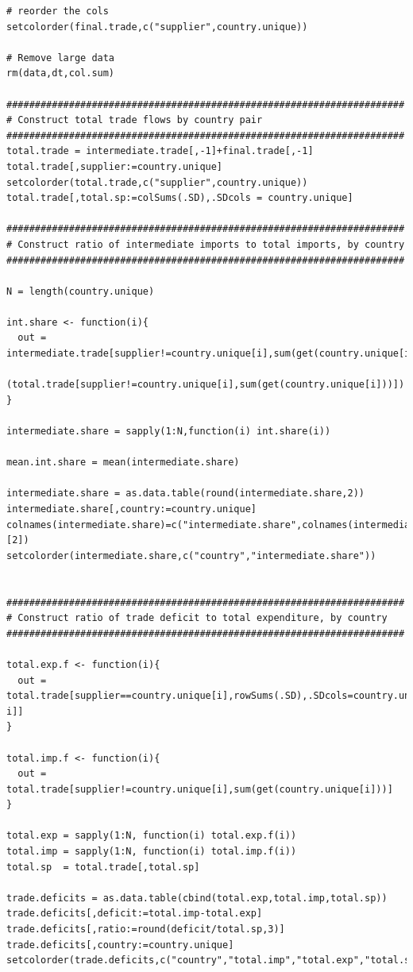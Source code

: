 \documentclass[12pt]{article}
\begin{document}
\begin{verbatim}
# reorder the cols
setcolorder(final.trade,c("supplier",country.unique))

# Remove large data
rm(data,dt,col.sum)

######################################################################
# Construct total trade flows by country pair
######################################################################
total.trade = intermediate.trade[,-1]+final.trade[,-1]
total.trade[,supplier:=country.unique]
setcolorder(total.trade,c("supplier",country.unique))
total.trade[,total.sp:=colSums(.SD),.SDcols = country.unique]

######################################################################
# Construct ratio of intermediate imports to total imports, by country
######################################################################

N = length(country.unique)

int.share <- function(i){
  out = intermediate.trade[supplier!=country.unique[i],sum(get(country.unique[i]))]/+
    (total.trade[supplier!=country.unique[i],sum(get(country.unique[i]))])
}

intermediate.share = sapply(1:N,function(i) int.share(i))

mean.int.share = mean(intermediate.share)

intermediate.share = as.data.table(round(intermediate.share,2))
intermediate.share[,country:=country.unique]
colnames(intermediate.share)=c("intermediate.share",colnames(intermediate.share)[2])
setcolorder(intermediate.share,c("country","intermediate.share"))


######################################################################
# Construct ratio of trade deficit to total expenditure, by country
######################################################################

total.exp.f <- function(i){
  out = total.trade[supplier==country.unique[i],rowSums(.SD),.SDcols=country.unique[-i]]
}

total.imp.f <- function(i){
  out = total.trade[supplier!=country.unique[i],sum(get(country.unique[i]))]
}

total.exp = sapply(1:N, function(i) total.exp.f(i))
total.imp = sapply(1:N, function(i) total.imp.f(i))
total.sp  = total.trade[,total.sp]

trade.deficits = as.data.table(cbind(total.exp,total.imp,total.sp))
trade.deficits[,deficit:=total.imp-total.exp]
trade.deficits[,ratio:=round(deficit/total.sp,3)]
trade.deficits[,country:=country.unique]
setcolorder(trade.deficits,c("country","total.imp","total.exp","total.sp","ratio"))


\end{verbatim}
\end{document}
